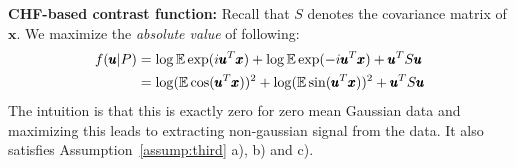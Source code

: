 \documentclass[letterpaper]{article}
\newtheorem{theorem}{Theorem}
\newcommand{\ba}[1]{\begin{align}#1\end{align}}
\newcommand{\bu}{\pmb{u}}
\newcommand{\bx}{\pmb{x}}
\newcommand{\bz}{\pmb{z}}
\newcommand{\bvar}{\pmb{a}}
\newcommand{\rd}{\color{red}}
\newcommand{\bk}{\color{black}}
\newcommand{\E}{\mathbb{E}}
\newcommand{\bb}[1]{\left(#1\right)}
\newcommand{\bbb}[1]{\left[#1\right]}
\DeclareMathOperator{\diag}{diag}
\begin{document}
\textbf{CHF-based contrast function:} Recall that $S$ denotes the covariance matrix of $\bx$. We maximize the \textit{absolute value} of following:
\ba{
f(\bu|P) &= \log\E\exp(i\bu^T\bx)+\log \E\exp(-i\bu^T\bx) 
         + \bu^TS\bu\notag\\ 
 &=\log(\E\cos(\bu^T\bx))^2+\log (\E\sin(\bu^T\bx))^2+\bu^TS\bu\label{eq:logchf}
}
The intuition is that this is exactly zero for zero mean Gaussian data and maximizing this leads to extracting non-gaussian signal from the data. It also satisfies Assumption~\ref{assump:third} a), b) and c).


    
\end{document}
